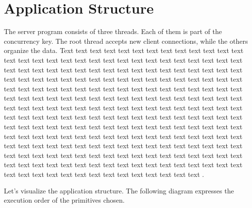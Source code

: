 \documentclass[runningheads]{llncs}
\begin{document}

\section{Application Structure}

The server program consists of three threads. Each of them is part of the concurrency key. The root thread accepts new client connections, while the others organize the data. Text text text text text text text text text text text text text text text text text text text text text text text text text text text text text text text text text text text text text text text text text text text text text text text text text text text text text text text text text text text text text text text text text text text text text text text text text text text text text text text text text text text text text text text text text text text text text text text text text text text text text text text text text text text text text text text text text text text text text text text text text text text text text text text text text text text text text text text text text text text text text text text text text text text text text text text text text text text text text text text text text text text text text text text text text text text text text text text text text text text text text text text text text text text text text text text text text text text text text text text text text text text text text text text text text text text text text text text text text text text text text text text text text text text text text text text .

Let's visualize the application structure. The following diagram expresses the execution order of the primitives chosen. 
    
\end{document}
